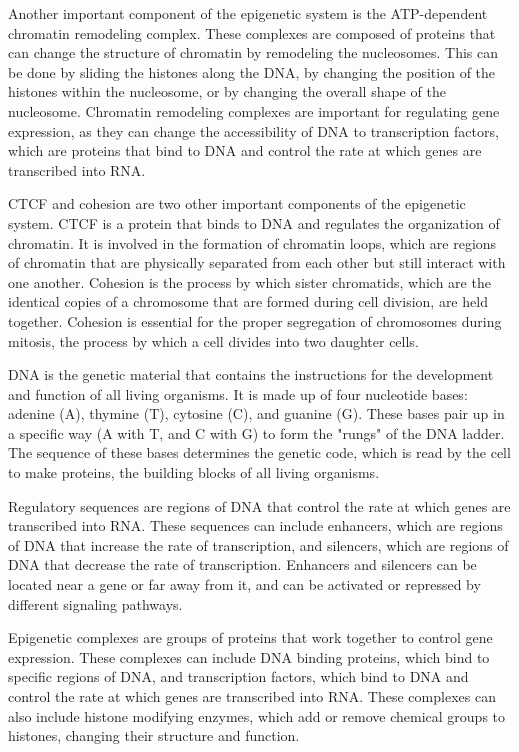 \begin{itemize}
\begin{itemize}
Another important component of the epigenetic system is the ATP-dependent chromatin remodeling complex. These complexes are composed of proteins that can change the structure of chromatin by remodeling the nucleosomes. This can be done by sliding the histones along the DNA, by changing the position of the histones within the nucleosome, or by changing the overall shape of the nucleosome. Chromatin remodeling complexes are important for regulating gene expression, as they can change the accessibility of DNA to transcription factors, which are proteins that bind to DNA and control the rate at which genes are transcribed into RNA.

CTCF and cohesion are two other important components of the epigenetic system. CTCF is a protein that binds to DNA and regulates the organization of chromatin. It is involved in the formation of chromatin loops, which are regions of chromatin that are physically separated from each other but still interact with one another. Cohesion is the process by which sister chromatids, which are the identical copies of a chromosome that are formed during cell division, are held together. Cohesion is essential for the proper segregation of chromosomes during mitosis, the process by which a cell divides into two daughter cells.

DNA is the genetic material that contains the instructions for the development and function of all living organisms. It is made up of four nucleotide bases: adenine (A), thymine (T), cytosine (C), and guanine (G). These bases pair up in a specific way (A with T, and C with G) to form the "rungs" of the DNA ladder. The sequence of these bases determines the genetic code, which is read by the cell to make proteins, the building blocks of all living organisms.

Regulatory sequences are regions of DNA that control the rate at which genes are transcribed into RNA. These sequences can include enhancers, which are regions of DNA that increase the rate of transcription, and silencers, which are regions of DNA that decrease the rate of transcription. Enhancers and silencers can be located near a gene or far away from it, and can be activated or repressed by different signaling pathways.

Epigenetic complexes are groups of proteins that work together to control gene expression. These complexes can include DNA binding proteins, which bind to specific regions of DNA, and transcription factors, which bind to DNA and control the rate at which genes are transcribed into RNA. These complexes can also include histone modifying enzymes, which add or remove chemical groups to histones, changing their structure and function.


\end{itemize}
\end{itemize}
